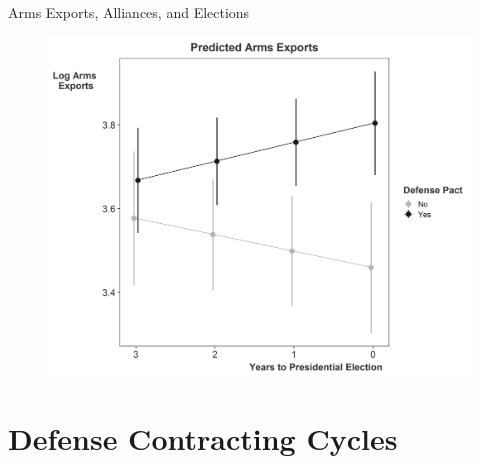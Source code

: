 \documentclass[12pt]{beamer}
\begin{document}

\begin{frame}{Arms Exports, Alliances, and Elections}

\begin{figure}[htbp]
	\centering
		\includegraphics[height=.90\textheight]{us-arms-pred.png}
\end{figure}

\end{frame}



\section{Defense Contracting Cycles} 

\end{document}

